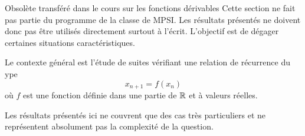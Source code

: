 

Obsolète transféré dans le cours sur les fonctions dérivables
Cette section ne fait pas partie du programme de la classe de MPSI. Les résultats présentés ne doivent donc pas être utilisés directement surtout à l'écrit. L'objectif est de dégager certaines situations caractéristiques.

Le contexte général est l'étude de suites vérifiant une relation de récurrence du ype
\begin{displaymath}
 x_{n+1}=f(x_n)
\end{displaymath}
où $f$ est une fonction définie dans une partie de $\mathbb{R}$ et à valeurs réelles.

Les résultats présentés ici ne couvrent que des cas très particuliers et ne représentent absolument pas la complexité de la question.
